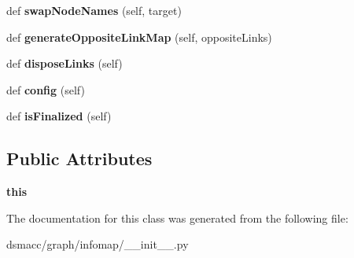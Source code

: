 \begin{DoxyCompactItemize}
def {\bfseries swap\+Node\+Names} (self, target)
\item 
\mbox{\label{classdsmacc_1_1graph_1_1infomap_1_1Network_a2c2a85af2eb1032d7e631c6d3a665684}} 
def {\bfseries generate\+Opposite\+Link\+Map} (self, opposite\+Links)
\item 
\mbox{\label{classdsmacc_1_1graph_1_1infomap_1_1Network_aa6e52443f4c5b429d60019071da7aec7}} 
def {\bfseries dispose\+Links} (self)
\item 
\mbox{\label{classdsmacc_1_1graph_1_1infomap_1_1Network_a977a9dae9c9a8d2c1d72c1f0b302db86}} 
def {\bfseries config} (self)
\item 
\mbox{\label{classdsmacc_1_1graph_1_1infomap_1_1Network_a8aa9c3246062026a643d286300111819}} 
def {\bfseries is\+Finalized} (self)
\end{DoxyCompactItemize}
\subsection*{Public Attributes}
\begin{DoxyCompactItemize}
\item 
\mbox{\label{classdsmacc_1_1graph_1_1infomap_1_1Network_a0d960ec9c2809a5953eb383a7e71ec85}} 
{\bfseries this}
\end{DoxyCompactItemize}


The documentation for this class was generated from the following file\+:\begin{DoxyCompactItemize}
\item 
dsmacc/graph/infomap/\+\_\+\+\_\+init\+\_\+\+\_\+.\+py\end{DoxyCompactItemize}
